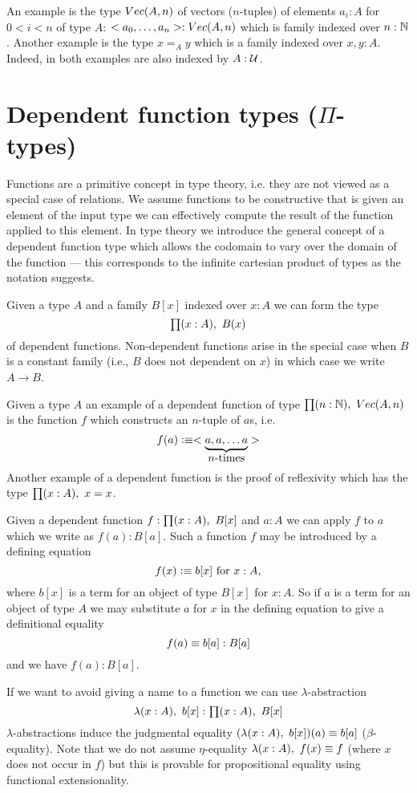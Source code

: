 An example is the type $Vec(A,n)$ of
vectors ($n$-tuples) of elements $a_i : A$ for $0 < i< n$ of type $A$:
$<a_0,\dots,a_n> : Vec(A,n)$ which is family indexed
over $n : \mathbb{N}$. Another example is the type $x =_A y$ which is a
family indexed over $x,y : A$. Indeed, in both examples are also
indexed by $A:\mathcal{U}$.

\section{Dependent function types (\texorpdfstring{$\Pi$}{Π}-types)}
\label{sec:pi-types}

Functions are a primitive concept in type theory, i.e. they are not
viewed as a special case of relations. We assume functions to be
constructive that is given an element of the input type we can
effectively compute the result of the function applied to this
element. In type theory we introduce the general concept of a
dependent function type which allows the codomain to vary over the
domain of the function --- this corresponds to the infinite cartesian
product of types as the notation suggests. 

Given a type $A$
and a family $B[x]$ indexed over $x:A$ we can form the type
\[\prd{x:A}B(x)\] of dependent functions. Non-dependent functions arise
in the special case when $B$ is a constant family (i.e., $B$ does not
dependent on $x$) in which case we write $A \to B$.

Given a type $A$ an example of a dependent function of type
$\prd{n:\Nat}\Vect(A,n)$
is the function $f$ which constructs an $n$-tuple of $a$s, i.e. 
\[ f(a) \vcentcolon\equiv <\underbrace{a,a,\dots a}_{\mbox{$n$-times}}> \] %
 Another example
of a dependent function is the proof of reflexivity which has the type
$\prd{x:A}x = x$.

Given a dependent function $f : \prd{x:A}B[x]$ and $a : A$ we can
apply $f$ to $a$ which we write as $f(a) : B[a]$.  Such a function $f$ may be introduced by a defining equation
  \[ f(x)\vcentcolon\equiv b[x]\mbox{ for } x:A,\]
where $b[x]$ is a term for an object of type $B[x]$ for $x:A$. So if $a$ is a term for an object of type $A$ we may substitute $a$ for $x$ in the defining equation to give a definitional equality
  \[ f(a)\equiv b[a]:B[a]\]
and we have $f(a):B[a]$. 

If we want to avoid giving a name to a function we can use
$\lambda$-abstraction 
\[\lam{x:A}b[x] : \prd{x:A}B[x]\]
$\lambda$-abstractions induce the judgmental equality
$(\lam{x:A}b[x])(a) \jdeq b[a]$ ($\beta$-equality). Note that
we do not assume $\eta$-equality $\lam{x:A} f(x) \jdeq f$ (where
$x$ does not occur in $f$) but this is provable for propositional
equality using functional extensionality.

